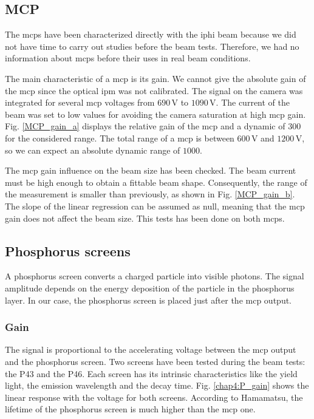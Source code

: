 \begin{refsection}
  \subsection{MCP}
  The \acrshort{mcp}s have been characterized directly with the \acrshort{iphi} beam because we did not have time to carry out studies before the beam tests. Therefore, we had no information about \acrshort{mcp}s before their uses in real beam conditions.

  The main characteristic of a \acrshort{mcp} is its gain. We cannot give the absolute gain of the \acrshort{mcp} since the optical \acrshort{ipm} was not calibrated. The signal on the camera was integrated for several \acrshort{mcp} voltages from $690\,\mathrm{V}$ to $1090\,\mathrm{V}$. The current of the beam was set to low values for avoiding the camera saturation at high \acrshort{mcp} gain. Fig. \ref{MCP_gain_a} displays the relative gain of the \acrshort{mcp} and a dynamic of $300$ for the considered range. The total range of a \acrshort{mcp} is between $600\,\mathrm{V}$ and $1200\,\mathrm{V}$, so we can expect an absolute dynamic range of $1000$.

  The \acrshort{mcp} gain influence on the beam size has been checked. The beam current must be high enough to obtain a fittable beam shape. Consequently, the range of the measurement is smaller than previously, as shown in Fig. \ref{MCP_gain_b}. The slope of the linear regression can be assumed as null, meaning that the \acrshort{mcp} gain does not affect the beam size. This tests has been done on both \acrshort{mcp}s.

  

  \subsection{Phosphorus screens}

  A phosphorus screen converts a charged particle into visible photons.
  The signal amplitude depends on the energy deposition of the particle in the phosphorus layer. In our case, the phosphorus screen is placed just after the \acrshort{mcp} output.

  \subsubsection{Gain}

  The signal is proportional to the accelerating voltage between the \acrshort{mcp} output and the phosphorus screen. Two screens have been tested during the beam tests: the P43 and the P46. Each screen has its intrinsic characteristics like the yield light, the emission wavelength and the decay time. Fig. \ref{chap4:P_gain} shows the linear response with the voltage for both screens. According to Hamamatsu, the lifetime of the phosphorus screen is much higher than the \acrshort{mcp} one.


\end{refsection}
